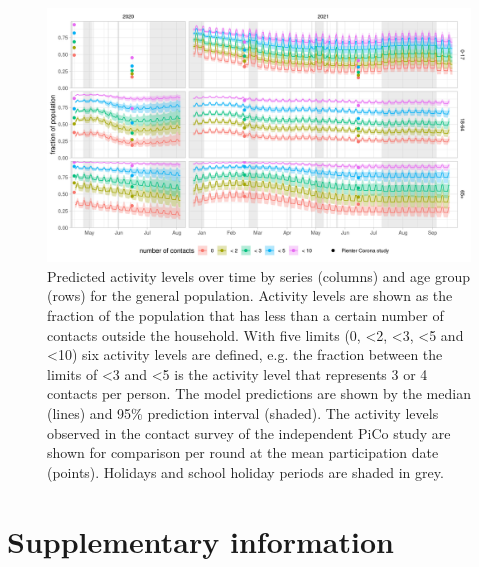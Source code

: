 \documentclass[fleqn,10pt]{wlscirep}
\begin{document}
\clearpage

\begin{figure}[ht]
\centering
\includegraphics[width=\linewidth]{../figures/prediction_generalpopulation_cat6.png}
\caption{Predicted activity levels over time by series (columns) and age group (rows) for the general population. Activity levels are shown as the fraction of the population that has less than a certain number of contacts outside the household. With five limits (0, <2, <3, <5 and <10) six activity levels are defined, e.g. the fraction between the limits of <3 and <5 is the activity level that represents 3 or 4 contacts per person. The model predictions are shown by the median (lines) and 95\% prediction interval (shaded). The activity levels observed in the contact survey of the independent PiCo study are shown for comparison per round at the mean participation date (points). Holidays and school holiday periods are shaded in grey.}
\label{fig:genpop}
\end{figure}

\clearpage



\section*{Supplementary information}


\renewcommand{\thefigure}{S\arabic{figure}}
\setcounter{figure}{0}
\renewcommand{\thetable}{S\arabic{table}}
\setcounter{table}{0}
\end{document}
